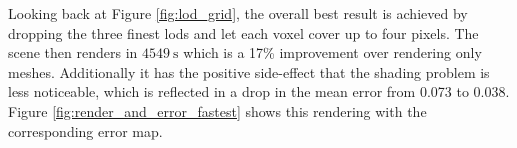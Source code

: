 Looking back at Figure \ref{fig:lod_grid}, the overall best result is achieved by dropping the three finest \acsp{lod} and let each voxel cover up to four pixels.
The scene then renders in $\SI{4549}{\s}$ which is a 17\% improvement over rendering only meshes.
Additionally it has the positive side-effect that the shading problem is less noticeable, which is reflected in a drop in the mean \FLIP error from 0.073 to 0.038.
Figure \ref{fig:render_and_error_fastest} shows this rendering with the corresponding \FLIP error map.
\begin{figure}[ht]
    \centering
    \begin{subfigure}[b]{\linewidth}
\end{subfigure}
\end{figure}
